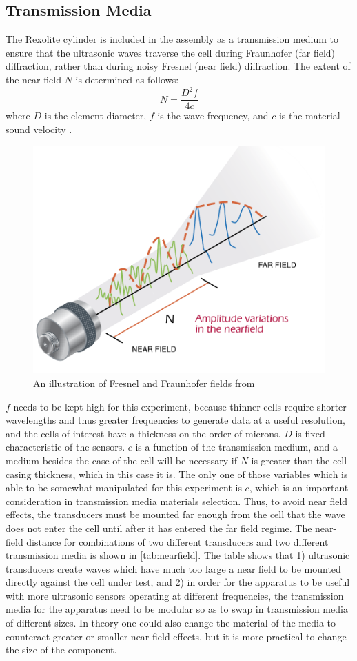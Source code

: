 \subsection{Transmission Media}
The Rexolite cylinder is included in the assembly as a transmission medium to ensure that the ultrasonic waves traverse the cell during Fraunhofer (far field) diffraction, rather than during noisy Fresnel (near field) diffraction. The extent of the near field $N$ is determined as follows:
$$\label{eq:nearfield} N= \frac{D^2 f} {4c} $$
where $D$ is the element diameter, $f$ is the wave frequency, and $c$ is the material sound velocity \cite{OLYMPUS}.
\begin{figure}[t]\label{fig:fieldEffects}
\includegraphics[]{fields-olympus-45}
\centering
\caption{An illustration of Fresnel and Fraunhofer fields from \cite{OLYMPUS}}
\end{figure}
$f$ needs to be kept high for this experiment, because thinner cells require shorter wavelengths and thus greater frequencies to generate data at a useful resolution, and the cells of interest have a thickness on the order of microns. $D$ is fixed characteristic of the sensors. $c$ is a function of the transmission medium, and a medium besides the case of the cell will be necessary if $N$ is greater than the cell casing thickness, which in this case it is. The only one of those variables which is able to be somewhat manipulated for this experiment is $c$, which is an important consideration in transmission media materials selection. 
Thus, to avoid near field effects, the transducers must be mounted far enough from the cell that the wave does not enter the cell until after it has entered the far field regime. The near-field distance for combinations of two different transducers and two different transmission media is shown in \autoref{tab:nearfield}. The table shows that 1) ultrasonic transducers create waves which have much too large a near field to be mounted directly against the cell under test, and 2) in order for the apparatus to be useful with more ultrasonic sensors operating at different frequencies, the transmission media for the apparatus need to be modular so as to swap in transmission media of different sizes. In theory one could also change the material of the media to counteract greater or smaller near field effects, but it is more practical to change the size of the component. 

